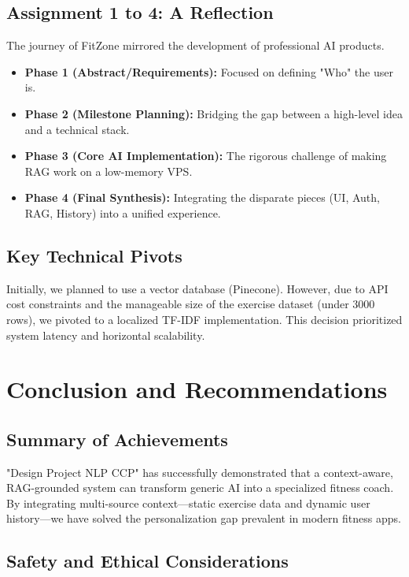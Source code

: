 \documentclass[12pt,a4paper]{report}
\begin{document}
\section{Assignment 1 to 4: A Reflection}
The journey of FitZone mirrored the development of professional AI products.
\begin{itemize}
    \item \textbf{Phase 1 (Abstract/Requirements):} Focused on defining "Who" the user is.
    \item \textbf{Phase 2 (Milestone Planning):} Bridging the gap between a high-level idea and a technical stack.
    \item \textbf{Phase 3 (Core AI Implementation):} The rigorous challenge of making RAG work on a low-memory VPS.
    \item \textbf{Phase 4 (Final Synthesis):} Integrating the disparate pieces (UI, Auth, RAG, History) into a unified experience.
\end{itemize}

\section{Key Technical Pivots}
Initially, we planned to use a vector database (Pinecone). However, due to API cost constraints and the manageable size of the exercise dataset (under 3000 rows), we pivoted to a localized TF-IDF implementation. This decision prioritized system latency and horizontal scalability.

\chapter{Conclusion and Recommendations}

\section{Summary of Achievements}
"Design Project NLP CCP" has successfully demonstrated that a context-aware, RAG-grounded system can transform generic AI into a specialized fitness coach. By integrating multi-source context—static exercise data and dynamic user history—we have solved the personalization gap prevalent in modern fitness apps.

\section{Safety and Ethical Considerations}
\end{document}
